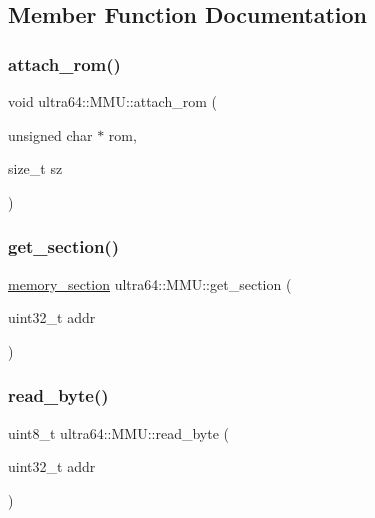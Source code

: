 \subsection{Member Function Documentation}
\mbox{\label{classultra64_1_1_m_m_u_aba8d57fd9862ade57d54b1581dd93682}} 
\subsubsection{\texorpdfstring{attach\+\_\+rom()}{attach\_rom()}}
{\footnotesize\ttfamily void ultra64\+::\+M\+M\+U\+::attach\+\_\+rom (\begin{DoxyParamCaption}\item[{unsigned char $\ast$}]{rom,  }\item[{size\+\_\+t}]{sz }\end{DoxyParamCaption})}

\mbox{\label{classultra64_1_1_m_m_u_a30dc6643202a4b3a435cd7458fb4b6b4}} 
\subsubsection{\texorpdfstring{get\+\_\+section()}{get\_section()}}
{\footnotesize\ttfamily \hyperlink{structultra64_1_1memory__section}{memory\+\_\+section} ultra64\+::\+M\+M\+U\+::get\+\_\+section (\begin{DoxyParamCaption}\item[{uint32\+\_\+t}]{addr }\end{DoxyParamCaption})\hspace{0.3cm}{\ttfamily [private]}}

\mbox{\label{classultra64_1_1_m_m_u_a8cdfede1aebd137ae20dfda84f0e23a1}} 
\subsubsection{\texorpdfstring{read\+\_\+byte()}{read\_byte()}}
{\footnotesize\ttfamily uint8\+\_\+t ultra64\+::\+M\+M\+U\+::read\+\_\+byte (\begin{DoxyParamCaption}\item[{uint32\+\_\+t}]{addr }\end{DoxyParamCaption})}


